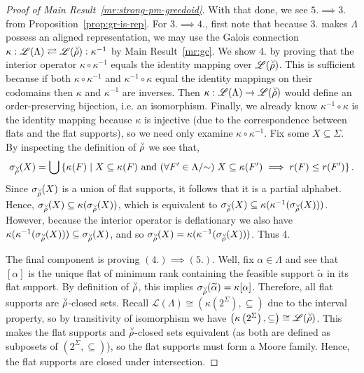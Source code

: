 \documentclass[11pt]{article}
\newcommand{\univ}{\Sigma}
\newcommand{\glang}{\Lambda}
\providecommand{\L}{}
\renewcommand{\L}{\mathscr{L}}
\begin{document}
\begin{proof}[Proof of Main Result~\ref{mr:strong-pm-greedoid}]
    With that done, we see $5.\implies 3.$ from Proposition~\ref{prop:gr-is-rep}. 
    For $3. \implies 4.$, first note that because 3. makes $\glang$ possess an aligned representation, we may use the Galois connection $\kappa:\L(\glang)\rightleftarrows\L(\accentset{\vee}{\rho}):\kappa^{-1}$ by Main Result~\ref{mr:gc}.
    We show 4. by proving that the interior operator $\kappa\circ\kappa^{-1}$ equals the identity mapping over $\L(\accentset{\vee}{\rho})$.
    This is sufficient because if both $\kappa\circ\kappa^{-1}$ and $\kappa^{-1}\circ\kappa$ equal the identity mappings on their codomains then $\kappa$ and $\kappa^{-1}$ are inverses.
    Then $\kappa:\L(\glang)\to\L(\accentset{\vee}{\rho})$ would define an order-preserving bijection, i.e. an isomorphism.
    Finally, we already know $\kappa^{-1}\circ\kappa$ is the identity mapping because $\kappa$ is injective (due to the correspondence between flats and the flat supports), so we need only examine $\kappa\circ\kappa^{-1}$.
    Fix some $X\subseteq \univ$.
    By inspecting the definition of $\accentset{\vee}{\rho}$ we see that,
    \[
        \sigma_{\accentset{\vee}{\rho}}(X) = \bigcup\left\{\kappa(F)\mid X\subseteq\kappa(F)\text{ and }(\forall F'\in\glang/\mathord{\sim})\;X\subseteq\kappa(F')\implies r(F) \leq r(F')\right\}.
    \]
    Since $\sigma_{\accentset{\vee}{\rho}}(X)$ is a union of flat supports, it follows that it is a partial alphabet.
    Hence, $\sigma_{\accentset{\vee}{\rho}}(X) \subseteq \kappa(\sigma_{\accentset{\vee}{\rho}}(X))$, which is equivalent to
    $\sigma_{\accentset{\vee}{\rho}}(X)\subseteq \kappa(\kappa^{-1}(\sigma_{\accentset{\vee}{\rho}}(X)))$.
    However, because the interior operator is deflationary we also have $\kappa(\kappa^{-1}(\sigma_{\accentset{\vee}{\rho}}(X))) \subseteq \sigma_{\accentset{\vee}{\rho}}(X)$, and so $\sigma_{\accentset{\vee}{\rho}}(X) = \kappa(\kappa^{-1}(\sigma_{\accentset{\vee}{\rho}}(X)))$.
    Thus 4.

    The final component is proving $(4.)\implies (5.)$.
    Well, fix $\alpha \in \glang$ and see that $[\alpha]$ is the unique flat of minimum rank containing the feasible support $\widetilde{\alpha}$ in its flat support.
    By definition of $\accentset{\vee}{\rho}$, this implies $\sigma_{\accentset{\vee}{\rho}}(\widetilde{\alpha}) = \kappa[\alpha]$.
    Therefore, all flat supports are $\accentset{\vee}{\rho}$-closed sets.
    Recall $\L(\glang)\cong\left(\kappa\left(2^\univ\right),\subseteq\right)$ due to the interval property, so by transitivity of isomorphism we have $\left(\kappa\left(2^\univ\right),\subseteq\right)\cong\L(\accentset{\vee}{\rho})$.
    This makes the flat supports and $\accentset{\vee}{\rho}$-closed sets equivalent (as both are defined as subposets of $(2^\univ,\subseteq)$), so the flat supports must form a Moore family.
    Hence, the flat supports are closed under intersection.
\end{proof}
\end{document}
